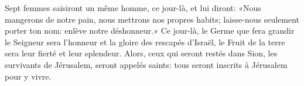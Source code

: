 Sept femmes saisiront un même homme, ce jour-là, et lui diront:
	«Nous mangerons de notre pain, nous mettrons nos propres habits;
	laisse-nous seulement porter ton nom: enlève notre déshonneur.»
Ce jour-là, le Germe que fera grandir le Seigneur
	sera l’honneur et la gloire des rescapés d’Israël,
	le Fruit de la terre sera leur fierté et leur splendeur.
Alors, ceux qui seront restés dans Sion, les survivants de Jérusalem,
	seront appelés saints:
	tous seront inscrits à Jérusalem pour y vivre.
